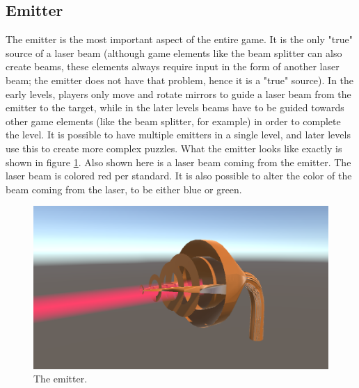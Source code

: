 		\subsection{Emitter} \label{ssec:emitter}
			The emitter is the most important aspect of the entire game.
			It is the only "true" source of a laser beam (although game
			elements like the beam splitter can also create beams, these
			elements always require input in the form of another laser
			beam; the emitter does not have that problem, hence it is a "true"
			source). In the early levels, players only move and rotate mirrors
			to guide a laser beam from the emitter to the target, while in the
			later levels beams have to be guided towards other game elements
			(like the beam splitter, for example) in order to complete the
			level. It is possible to have multiple emitters in a single level,
			and later levels use this to create more complex puzzles.
			What the emitter looks like exactly is shown in figure 
			\ref{fig:emitter}. Also shown here is a laser beam
			coming from the emitter. The laser beam is colored red per 
			standard. It is also possible to alter the color of the beam coming
			from the laser, to be either blue or green.
			\begin{figure}[!ht]
				\centering
				\includegraphics[scale = 0.25]{Emitter}
				\caption{The emitter.}
				\label{fig:emitter}
			\end{figure}
			

